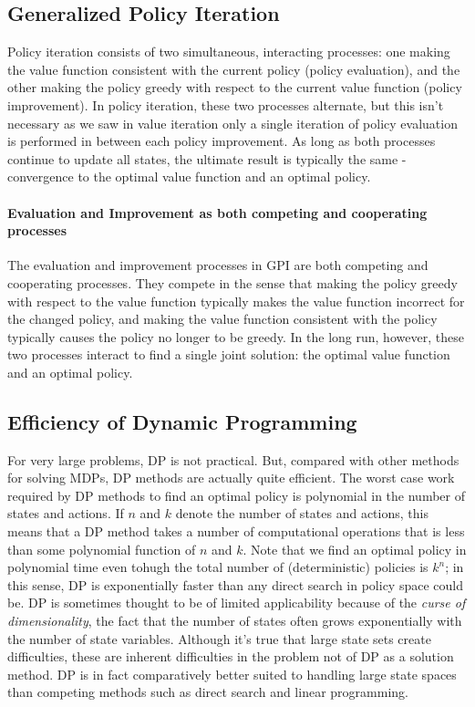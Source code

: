 \documentclass[12pt]{article}
\begin{document}
\subsection{Generalized Policy Iteration}
Policy iteration consists of two simultaneous, interacting processes: one making the value function consistent with the current policy (policy evaluation), and the other making the policy greedy with respect to the current value function (policy improvement). In policy iteration, these two processes alternate, but this isn't necessary as we saw in value iteration only a single iteration of policy evaluation is performed in between each policy improvement.  As long as both processes continue to update all states, the ultimate result is typically the same - convergence to the optimal value function and an optimal policy.

\paragraph{Evaluation and Improvement as both competing and cooperating processes}
The evaluation and improvement processes in GPI are both competing and cooperating processes. They compete in the sense that making the policy greedy with respect to the value function typically makes the value function incorrect for the changed policy, and making the value function consistent with the policy typically causes the policy no longer to be greedy. In the long run, however, these two processes interact to find a single joint solution: the optimal value function and an optimal policy.

\subsection{Efficiency of Dynamic Programming}
For very large problems, DP is not practical. But, compared with other methods for solving MDPs, DP methods are actually quite efficient. The worst case work required by DP methods to find an optimal policy is polynomial in the number of states and actions. If $n$ and $k$ denote the number of states and actions, this means that a DP method takes a number of computational operations that is less than some polynomial function of $n$ and $k$. Note that we find an optimal policy in polynomial time even tohugh the total number of (deterministic) policies is $k^n$; in this sense, DP is exponentially faster than any direct search in policy space could be. DP is sometimes thought to be of limited applicability because of the \emph{curse of dimensionality}, the fact that the number of states often grows exponentially with the number of state variables. Although it's true that large state sets create difficulties, these are inherent difficulties in the problem not of DP as a solution method. DP is in fact comparatively better suited to handling large state spaces than competing methods such as direct search and linear programming.
\end{document}
